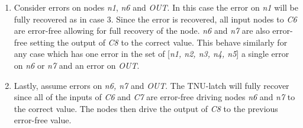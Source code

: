 \begin{enumerate}
	\item Consider errors on nodes \textit{n1}, \textit{n6} and \textit{OUT}. In this case the error on \textit{n1} will be fully recovered as in case 3. Since the error is recovered, all input nodes to \textit{C6} are error-free allowing for full recovery of the node. \textit{n6} and \textit{n7} are also error-free setting the output of \textit{C8} to the correct value. This behave similarly for any case which has one error in the set of [\textit{n1, n2, n3, n4, n5}] a single error on \textit{n6} or \textit{n7} and an error on \textit{OUT}.
	
	\item Lastly, assume errors on \textit{n6, n7} and \textit{OUT}. The TNU-latch will fully recover since all of the inputs of \textit{C6} and \textit{C7} are error-free driving nodes \textit{n6} and \textit{n7} to the correct value. The nodes then drive the output of \textit{C8} to the previous error-free value.
	
\end{enumerate}

